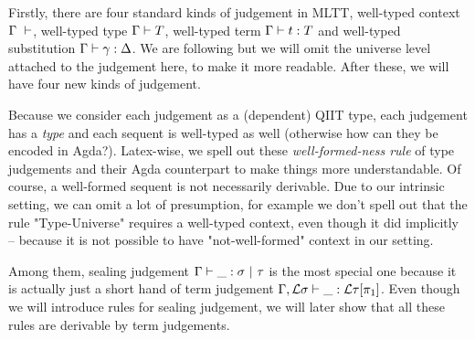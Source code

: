 Firstly, there are four standard kinds of judgement in MLTT, well-typed context $\goodCtx{\Gamma}{l}$, well-typed type $\goodType{\Gamma}{T}{l}$, well-typed term $\goodTerm{\Gamma}{t}{T}$ and well-typed substitution $\goodSub{\Gamma}{\gamma}{\Delta}$. We are following \citep{kaposi2019gluing} but we will omit the universe level attached to the judgement here, to make it more readable. After these, we will have four new kinds of judgement. 

Because we consider each judgement as a (dependent) QIIT type, each judgement has a \textit{type} and each sequent is well-typed as well (otherwise how can they be encoded in Agda?).
Latex-wise, we spell out these \textit{well-formed-ness rule} of type judgements and their Agda counterpart to make things more understandable. Of course, a well-formed sequent  is not necessarily derivable. 
Due to our intrinsic setting, we can omit a lot of presumption, for example we don't spell out that the rule "Type-Universe" requires a well-typed context, even though it did implicitly -- because it is not possible to have "not-well-formed" context in our setting.

Among them, sealing judgement $\goodSeal{\Gamma}{\_}{\sigma}{\tau}$ is the most special one because it is actually just a short hand of term judgement $\goodTerm{\Gamma , \cL \sigma}{\_}{\cL\tau[\pi_1]}$. Even though we will introduce rules for sealing judgement, we will later show that all these rules are derivable by term judgements.

